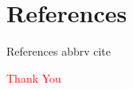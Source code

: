 \documentclass{beamer}
\begin{document}
\section{References}
\begin{frame}[allowframebreaks]{References}
	 {abbrv}
	 {cite}
\end{frame}

\begin{frame}
	\begin{center}
	\LARGE
	\textcolor{red}{Thank You}
	\end{center}
\end{frame}
\end{document}
